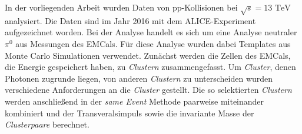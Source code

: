 In der vorliegenden Arbeit wurden Daten von pp-Kollisionen bei $\sqrt{s}=13\text{ TeV}$ analysiert.
Die Daten sind im Jahr 2016 mit dem ALICE-Experiment aufgezeichnet worden.
Bei der Analyse handelt es sich um eine Analyse neutraler $\pi^{0}$ aus Messungen des EMCals.
Für diese Analyse wurden dabei Templates aus Monte Carlo Simulationen verwendet.
\newline
Zunächst werden die Zellen des EMCals, die Energie gespeichert haben, zu \textit{Clustern} zusammengefasst.
Um \textit{Cluster}, denen Photonen zugrunde liegen, von anderen \textit{Clustern} zu unterscheiden wurden verschiedene Anforderungen an die \textit{Cluster} gestellt.
Die so selektierten \textit{Clustern} werden anschließend in der \textit{same Event} Methode paarweise miteinander kombiniert und der Transveralsimpuls sowie die invariante Masse der \textit{Clusterpaare} berechnet.